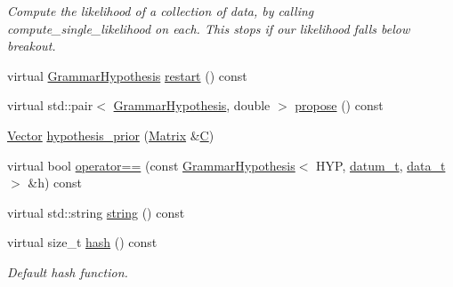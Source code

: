 \begin{DoxyCompactItemize}
\begin{DoxyCompactList}\small\item\em Compute the likelihood of a collection of data, by calling compute\+\_\+single\+\_\+likelihood on each. This stops if our likelihood falls below breakout. \end{DoxyCompactList}\item 
virtual \hyperlink{class_grammar_hypothesis}{Grammar\+Hypothesis} \hyperlink{class_grammar_hypothesis_aa0d96def3fe7e22a2bbf2c89ba996bcf}{restart} () const
\item 
virtual std\+::pair$<$ \hyperlink{class_grammar_hypothesis}{Grammar\+Hypothesis}, double $>$ \hyperlink{class_grammar_hypothesis_aab60215dfe06a059389db9c7f95e9ce7}{propose} () const
\item 
\hyperlink{_eigen_numerics_8h_aca2956bc379bce2ed88ab3c0e1b61d1d}{Vector} \hyperlink{class_grammar_hypothesis_aaa7c2208808f4a1e7995c872e5c75028}{hypothesis\+\_\+prior} (\hyperlink{_eigen_numerics_8h_a645222978e81acfb2523a9bce34aecc0}{Matrix} \&\hyperlink{class_grammar_hypothesis_a687b9ff3ffd2c19439707530a5ace6f2}{C})
\item 
virtual bool \hyperlink{class_grammar_hypothesis_a7a7e6c0c5a15fc32904f5113fd4e0371}{operator==} (const \hyperlink{class_grammar_hypothesis}{Grammar\+Hypothesis}$<$ H\+YP, \hyperlink{class_bayesable_a9f1a6c0cd7855550fa10b1a8f13a5867}{datum\+\_\+t}, \hyperlink{class_bayesable_aa2788c4d7718c0a824e1d28c4c98f921}{data\+\_\+t} $>$ \&h) const
\item 
virtual std\+::string \hyperlink{class_grammar_hypothesis_a55ee98de75a30cea35fdaf62ccf14a90}{string} () const
\item 
virtual size\+\_\+t \hyperlink{class_grammar_hypothesis_a55297e7d1dac48158efa012445b93137}{hash} () const
\begin{DoxyCompactList}\small\item\em Default hash function. \end{DoxyCompactList}\end{DoxyCompactItemize}

